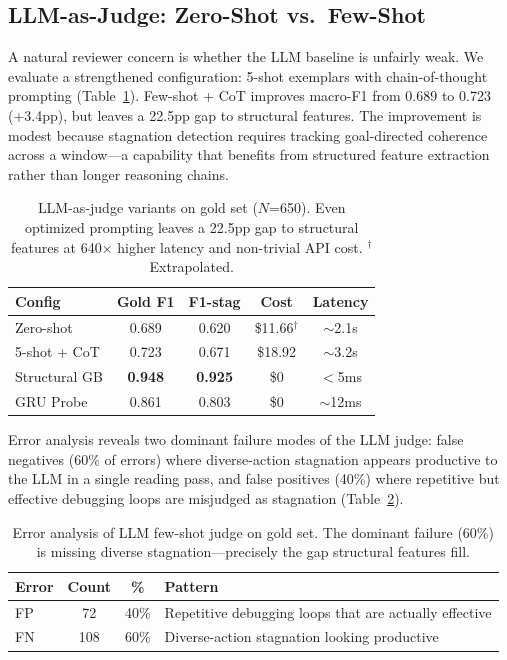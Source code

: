 \documentclass[11pt,a4paper]{article}
\begin{document}
\subsection{LLM-as-Judge: Zero-Shot vs.\ Few-Shot}
\label{sec:llm}

A natural reviewer concern is whether the LLM baseline is unfairly weak.
We evaluate a strengthened configuration: 5-shot exemplars with chain-of-thought prompting (Table~\ref{tab:llm}).
Few-shot + CoT improves macro-F1 from 0.689 to 0.723 (+3.4pp), but leaves a 22.5pp gap to structural features.
The improvement is modest because stagnation detection requires tracking goal-directed coherence across a window---a capability that benefits from structured feature extraction rather than longer reasoning chains.

\begin{table}[t]
\centering
\small
\begin{tabular}{lcccc}
\toprule
\textbf{Config} & \textbf{Gold F1} & \textbf{F1-stag} & \textbf{Cost} & \textbf{Latency} \\
\midrule
Zero-shot       & 0.689 & 0.620 & \$11.66$^\dagger$ & $\sim$2.1s \\
5-shot + CoT    & 0.723 & 0.671 & \$18.92 & $\sim$3.2s \\
\midrule
Structural GB   & \textbf{0.948} & \textbf{0.925} & \$0 & $<$5ms \\
GRU Probe       & 0.861 & 0.803 & \$0 & $\sim$12ms \\
\bottomrule
\end{tabular}
\caption{LLM-as-judge variants on gold set ($N$=650). Even optimized prompting leaves a 22.5pp gap to structural features at 640$\times$ higher latency and non-trivial API cost. $^\dagger$Extrapolated.}
\label{tab:llm}
\end{table}

Error analysis reveals two dominant failure modes of the LLM judge: false negatives (60\% of errors) where diverse-action stagnation appears productive to the LLM in a single reading pass, and false positives (40\%) where repetitive but effective debugging loops are misjudged as stagnation (Table~\ref{tab:llm-errors}).

\begin{table}[t]
\centering
\small
\begin{tabular}{lccp{4.2cm}}
\toprule
\textbf{Error} & \textbf{Count} & \textbf{\%} & \textbf{Pattern} \\
\midrule
FP & 72  & 40\% & Repetitive debugging loops that are actually effective \\
FN & 108 & 60\% & Diverse-action stagnation looking productive \\
\bottomrule
\end{tabular}
\caption{Error analysis of LLM few-shot judge on gold set. The dominant failure (60\%) is missing diverse stagnation---precisely the gap structural features fill.}
\label{tab:llm-errors}
\end{table}
\end{document}
